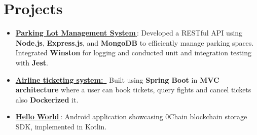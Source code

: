 \documentclass[letterpaper,1pt]{article}
\let\orighref\href
\renewcommand{\href}[2]{\orighref{#1}{#2\,\faExternalLink}}
\begin{document}
\section{Projects}
\begin{itemize}[leftmargin=*, itemsep=1pt, parsep=0pt]

  \item \href{https://github.com/yash10019coder/ParkingLotBackend}{\textbf{Parking Lot Management System}}: Developed a RESTful API using \textbf{Node.js}, \textbf{Express.js}, and \textbf{MongoDB} to efficiently manage parking spaces. Integrated \textbf{Winston} for logging and conducted unit and integration testing with \textbf{Jest}.
  \item \href{https://github.com/yash10019coder/airline-ticketing-system}{\textbf{Airline ticketing system: }} Built using \textbf{Spring Boot} in \textbf{MVC architecture} where a user can book tickets, query fights and cancel tickets also \textbf{Dockerized} it.
  \item \href{https://github.com/0chain/HelloWorld-Android}{\textbf{Hello World}}: Android application showcasing 0Chain blockchain storage SDK, implemented in Kotlin.

\end{itemize}
\end{document}
